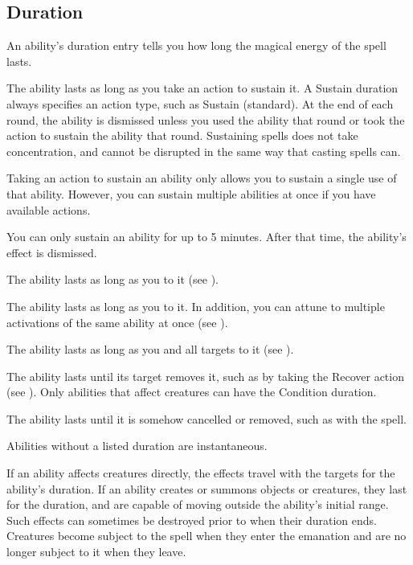     \subsection{Duration}

        An ability's duration entry tells you how long the magical energy of the spell lasts.

        \label{Sustain} The ability lasts as long as you take an action to sustain it.
        A Sustain duration always specifies an action type, such as Sustain (standard).
        At the end of each round, the ability is dismissed unless you used the ability that round or took the action to sustain the ability that round.
        Sustaining spells does not take concentration, and cannot be disrupted in the same way that casting spells can.

        Taking an action to sustain an ability only allows you to sustain a single use of that ability.
        However, you can sustain multiple abilities at once if you have available actions.

        You can only sustain an ability for up to 5 minutes.
        After that time, the ability's effect is dismissed.

         The ability lasts as long as you  to it (see ).

         The ability lasts as long as you  to it.
        In addition, you can attune to multiple activations of the same ability at once (see ).

         The ability lasts as long as you and all targets  to it (see ).

         The ability lasts until its target removes it, such as by taking the Recover action (see ).
        Only abilities that affect creatures can have the Condition duration.

         The ability lasts until it is somehow cancelled or removed, such as with the  spell.

         Abilities without a listed duration are instantaneous.

         If an ability affects creatures directly, the effects travel with the targets for the ability's duration.
        If an ability creates or summons objects or creatures, they last for the duration, and are capable of moving outside the ability's initial range.
        Such effects can sometimes be destroyed prior to when their duration ends.
        Creatures become subject to the spell when they enter the emanation and are no longer subject to it when they leave.

